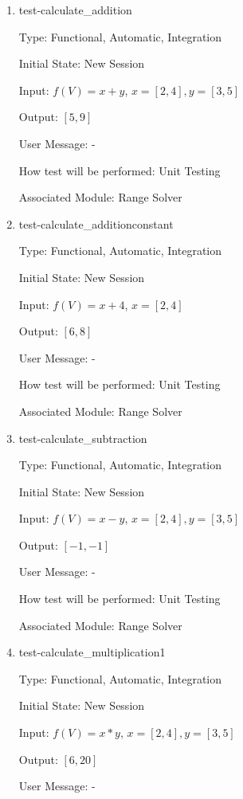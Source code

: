 \documentclass[12pt, titlepage]{article}
\begin{document}
\begin{enumerate}
	
	\item{test-calculate\_addition}
	
	Type: Functional, Automatic, Integration
	
	Initial State: New Session
	
	Input: $f(V) = x + y$, $x = [2,4], y = [3,5]$
	
	Output: $[5,9]$
	
	User Message: - 
	
	How test will be performed: Unit Testing
	
	Associated Module: Range Solver \\
	
	\item{test-calculate\_additionconstant}
	
	Type: Functional, Automatic, Integration
	
	Initial State: New Session
	
	Input: $f(V) = x + 4$, $x = [2,4]$
	
	Output: $[6,8]$
	
	User Message: - 
	
	How test will be performed: Unit Testing
	
	Associated Module: Range Solver\\
	
	\item{test-calculate\_subtraction}
	
	Type: Functional, Automatic, Integration
	
	Initial State: New Session
	
	Input: $f(V) = x - y$, $x = [2,4], y = [3,5]$
	
	Output: $[-1,-1]$
	
	User Message: - 
	
	How test will be performed: Unit Testing
	
	Associated Module: Range Solver\\
	
	\item{test-calculate\_multiplication1}
	
	Type: Functional, Automatic, Integration
	
	Initial State: New Session
	
	Input: $f(V) = x * y$, $x = [2,4], y = [3,5]$
	
	Output: $[6,20]$
	
	User Message: - 
	

\end{enumerate}
\end{document}
